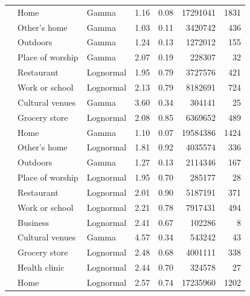 \documentclass[preprint, 3p,
authoryear]{elsarticle} %
\begin{document}
\begin{table}
{\begin{threeparttable}
\begin{tabular}[t]{rllrrrr}
 & Home & Gamma & 1.16 & 0.08 & 17291041 & 1831\\

 & Other's home & Gamma & 1.03 & 0.11 & 3420742 & 436\\

 & Outdoors & Gamma & 1.24 & 0.13 & 1272012 & 155\\

 & Place of worship & Gamma & 2.07 & 0.19 & 228307 & 32\\

 & Restaurant & Lognormal & 1.95 & 0.79 & 3727576 & 421\\

\multirow[t]{-8}{*}{\raggedleft\arraybackslash 2005} & Work or school & Lognormal & 2.13 & 0.79 & 8182691 & 724\\
\cmidrule{1-7}
 & Cultural venues & Gamma & 3.60 & 0.34 & 304141 & 25\\

 & Grocery store & Lognormal & 2.08 & 0.85 & 6369652 & 489\\

 & Home & Gamma & 1.10 & 0.07 & 19584386 & 1424\\

 & Other's home & Lognormal & 1.81 & 0.92 & 4035574 & 336\\

 & Outdoors & Gamma & 1.27 & 0.13 & 2114346 & 167\\

 & Place of worship & Lognormal & 1.95 & 0.70 & 285177 & 28\\

 & Restaurant & Lognormal & 2.01 & 0.90 & 5187191 & 371\\

\multirow[t]{-8}{*}{\raggedleft\arraybackslash 2010} & Work or school & Lognormal & 2.21 & 0.78 & 7917431 & 494\\
\cmidrule{1-7}
 & Business & Lognormal & 2.41 & 0.67 & 102286 & 8\\

 & Cultural venues & Gamma & 4.57 & 0.34 & 543242 & 43\\

 & Grocery store & Lognormal & 2.48 & 0.68 & 4001111 & 338\\

 & Health clinic & Lognormal & 2.44 & 0.70 & 324578 & 27\\

 & Home & Lognormal & 2.57 & 0.74 & 17235960 & 1202\\


\end{tabular}
\end{threeparttable}}
\end{table}
\end{document}
